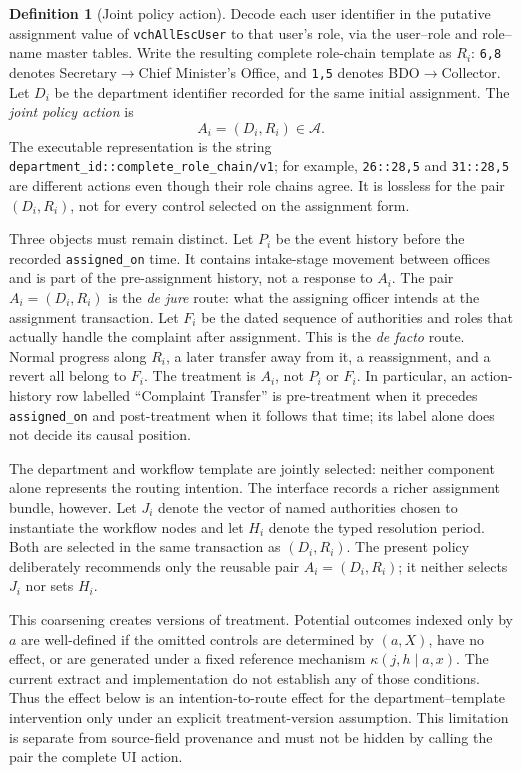 \documentclass[11pt,a4paper]{article}
\theoremstyle{plain}
\theoremstyle{definition}
\newtheorem{definition}[theorem]{Definition}
\theoremstyle{remark}
\newcommand{\code}[1]{\texttt{\small #1}}
\begin{document}
\begin{definition}[Joint policy action]\label{def:flow}
Decode each user identifier in the putative assignment value of \code{vchAllEscUser} to that
user's role, via the user--role and role--name master tables. Write the resulting complete
role-chain template as $R_i$: \code{6,8} denotes Secretary$\to$Chief Minister's Office, and
\code{1,5} denotes BDO$\to$Collector. Let $D_i$ be the department identifier recorded for the
same initial assignment. The \emph{joint policy action} is
\[
 A_i=(D_i,R_i)\in\mathcal A.
\]
The executable representation is the string
\code{department\_id::complete\_role\_chain/v1}; for example, \code{26::28,5} and
\code{31::28,5} are different actions even though their role chains agree. It is lossless for
the pair $(D_i,R_i)$, not for every control selected on the assignment form.
\end{definition}

Three objects must remain distinct. Let $P_i$ be the event history before the recorded
\code{assigned\_on} time. It contains intake-stage movement between offices and is part of the
pre-assignment history, not a response to $A_i$. The pair $A_i=(D_i,R_i)$ is the \emph{de jure}
route: what the assigning officer intends at the assignment transaction. Let $F_i$ be the dated
sequence of authorities and roles that actually handle the complaint after assignment. This is
the \emph{de facto} route. Normal progress along $R_i$, a later transfer away from it, a
reassignment, and a revert all belong to $F_i$. The treatment is $A_i$, not $P_i$ or $F_i$.
In particular, an action-history row labelled ``Complaint Transfer'' is pre-treatment when it
precedes \code{assigned\_on} and post-treatment when it follows that time; its label alone does
not decide its causal position.

The department and workflow template are jointly selected: neither component alone represents
the routing intention. The interface records a richer assignment bundle, however. Let $J_i$
denote the vector of named authorities chosen to instantiate the workflow nodes and let $H_i$
denote the typed resolution period. Both are selected in the same transaction as $(D_i,R_i)$.
The present policy deliberately recommends only the reusable pair $A_i=(D_i,R_i)$; it neither
selects $J_i$ nor sets $H_i$.

This coarsening creates versions of treatment. Potential outcomes indexed only by $a$ are
well-defined if the omitted controls are determined by $(a,X)$, have no effect, or are generated
under a fixed reference mechanism $\kappa(j,h\mid a,x)$. The current extract and implementation do
not establish any of those conditions. Thus the effect below is an intention-to-route effect
for the department--template intervention only under an explicit treatment-version assumption.
This limitation is separate from source-field provenance and must not be hidden by calling the
pair the complete UI action.
\end{document}
